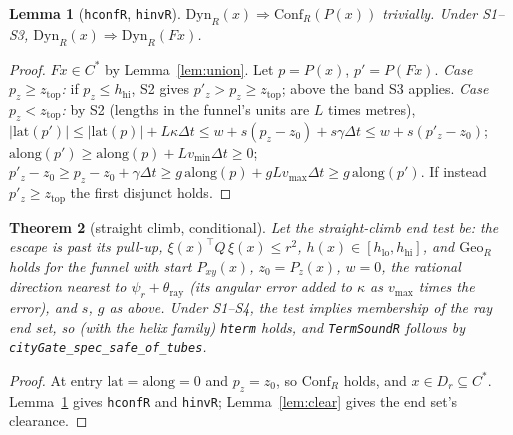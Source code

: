\documentclass[11pt]{article}
\newtheorem{theorem}{Theorem}
\newtheorem{lemma}[theorem]{Lemma}
\newcommand{\Conf}{\ensuremath{\mathrm{Conf}}}
\newcommand{\Geo}{\ensuremath{\mathrm{Geo}}}
\newcommand{\Dyn}{\ensuremath{\mathrm{Dyn}}}
\newcommand{\zTop}{z_{\mathrm{top}}}
\begin{document}
\begin{lemma}[\texttt{hconfR}, \texttt{hinvR}]\label{lem:dyninv}
$\Dyn_R(x) \Rightarrow \Conf_R(P(x))$ trivially. Under S1--S3, $\Dyn_R(x) \Rightarrow \Dyn_R(F x)$.
\end{lemma}
\begin{proof}
$Fx \in C^\ast$ by Lemma~\ref{lem:union}. Let $p = P(x)$, $p' = P(Fx)$.
\emph{Case $p_z \ge \zTop$:} if $p_z \le h_{\mathrm{hi}}$, S2 gives $p'_z > p_z \ge \zTop$; above the band S3 applies. \emph{Case $p_z < \zTop$:} by S2 (lengths in the funnel's units are $L$ times metres),
$|\mathrm{lat}(p')| \le |\mathrm{lat}(p)| + L\kappa\Delta t \le w + s(p_z - z_0) + s\gamma\Delta t \le w + s(p'_z - z_0)$;
$\mathrm{along}(p') \ge \mathrm{along}(p) + L v_{\min}\Delta t \ge 0$;
$p'_z - z_0 \ge p_z - z_0 + \gamma\Delta t \ge g\,\mathrm{along}(p) + g L v_{\max}\Delta t \ge g\,\mathrm{along}(p')$. If instead $p'_z \ge \zTop$ the first disjunct holds.
\end{proof}

\begin{theorem}[straight climb, conditional]\label{thm:main}
Let the straight-climb end test be: the escape is past its pull-up, $\xi(x)^\top Q\,\xi(x) \le r^2$, $h(x) \in [h_{\mathrm{lo}}, h_{\mathrm{hi}}]$, and $\Geo_R$ holds for the funnel with start $P_{xy}(x)$, $z_0 = P_z(x)$, $w = 0$, the rational direction nearest to $\psi_r + \theta_{\mathrm{ray}}$ (its angular error added to $\kappa$ as $v_{\max}$ times the error), and $s$, $g$ as above. Under S1--S4, the test implies membership of the ray end set, so (with the helix family) \texttt{hterm} holds, and \texttt{TermSoundR} follows by \texttt{cityGate\_spec\_safe\_of\_tubes}.
\end{theorem}
\begin{proof}
At entry $\mathrm{lat} = \mathrm{along} = 0$ and $p_z = z_0$, so $\Conf_R$ holds, and $x \in D_r \subseteq C^\ast$. Lemma~\ref{lem:dyninv} gives \texttt{hconfR} and \texttt{hinvR}; Lemma~\ref{lem:clear} gives the end set's clearance.
\end{proof}
\end{document}
